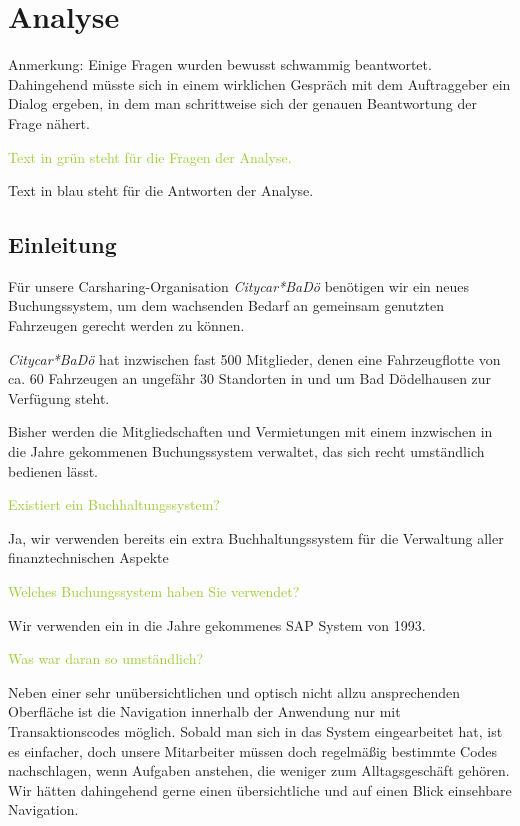 \chapter{Analyse}

Anmerkung: Einige Fragen wurden bewusst \grqq{}schwammig\grqq{} beantwortet. Dahingehend müsste sich in einem wirklichen Gespräch mit dem Auftraggeber ein Dialog ergeben, in dem man schrittweise sich der genauen Beantwortung der Frage nähert. 

\textcolor{YellowGreen}{Text in grün steht für die Fragen der Analyse.}

\textcolor{NavyBlue}{Text in blau steht für die Antworten der Analyse.}

\section{Einleitung}

Für unsere Carsharing-Organisation \emph{Citycar*BaDö} benötigen wir ein neues Buchungssystem, um dem wachsenden Bedarf an gemeinsam genutzten Fahrzeugen gerecht werden zu können. 

\emph{Citycar*BaDö} hat inzwischen fast 500 Mitglieder, denen eine Fahrzeugflotte von ca. 60 Fahrzeugen an ungefähr 30 Standorten in und um Bad Dödelhausen zur Verfügung steht. 

Bisher werden die Mitgliedschaften und Vermietungen mit einem inzwischen in die Jahre gekommenen Buchungssystem verwaltet, das sich recht umständlich bedienen lässt. 

\textcolor{YellowGreen}{Existiert ein Buchhaltungssystem?}

\textcolor{NavyBlue}{Ja, wir verwenden bereits ein extra Buchhaltungssystem für die Verwaltung aller finanztechnischen Aspekte}

\textcolor{YellowGreen}{Welches Buchungssystem haben Sie verwendet?}

\textcolor{NavyBlue}{Wir verwenden ein in die Jahre gekommenes SAP System von 1993.}

\textcolor{YellowGreen}{Was war daran so umständlich?}

\textcolor{NavyBlue}{Neben einer sehr unübersichtlichen und optisch nicht allzu ansprechenden Oberfläche ist die Navigation innerhalb der Anwendung nur mit Transaktionscodes möglich. Sobald man sich in das System eingearbeitet hat, ist es einfacher, doch unsere Mitarbeiter müssen doch regelmäßig bestimmte Codes nachschlagen, wenn Aufgaben anstehen, die weniger zum Alltagsgeschäft gehören. Wir hätten dahingehend gerne einen übersichtliche und auf einen Blick einsehbare Navigation.}

